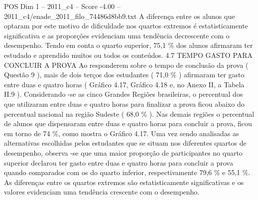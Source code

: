 \begin{textsample}{POS Dim 1 – 2011\_c4 – Score -4.00 – 2011\_c4/enade\_2011\_filo\_74486d8bb9.txt}
A diferença entre os alunos que optaram por este motivo de dificuldade nos quartos extremos é estatisticamente significativa e as proporções evidenciam uma tendência decrescente com o desempenho.
Tendo em conta o quarto superior, 75,1 \% dos alunos afirmaram ter estudado e aprendido muitos ou todos os conteúdos. 4.7 TEMPO GASTO PARA CONCLUIR A PROVA Ao responderem sobre o tempo de conclusão da prova ( Questão 9 ), mais de dois terços dos estudantes ( 71,0 \% ) afirmaram ter gasto entre duas e quatro horas ( Gráfico 4.17, Gráfico 4.18 e, no Anexo II, a Tabela II.9 ).
Considerando -se as cinco Grandes Regiões brasileiras, o percentual dos que utilizaram entre duas e quatro horas para finalizar a prova ficou abaixo do percentual nacional na região Sudeste ( 68,0 \% ).
Nas demais regiões o percentual de alunos que dispensaram entre duas e quatro horas para concluir a prova, ficou em torno de 74 \%, como mostra o Gráfico 4.17.
Uma vez sendo analisadas as alternativas escolhidas pelos estudantes que se situam nos diferentes quartos de desempenho, observa -se que uma maior proporção de participantes no quarto superior declarou ter gasto entre duas e quatro horas para concluir a prova quando comparados com os do quarto inferior, respectivamente 79,6 \% e 55,1 \%.
As diferenças entre os quartos extremos são estatisticamente significativas e os valores evidenciam uma tendência crescente com o desempenho.

\end{textsample}
